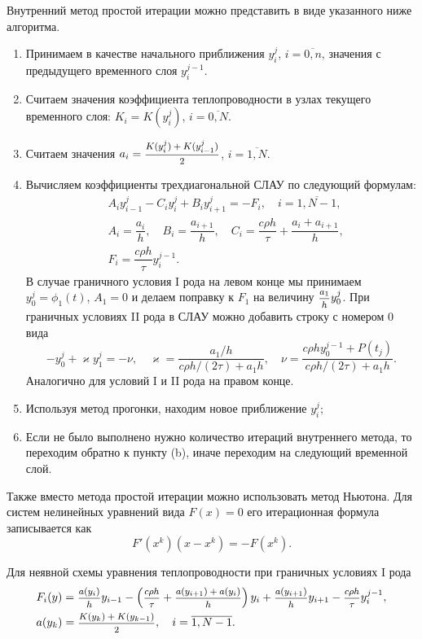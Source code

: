 \documentclass[12pt, a4paper]{article}
\begin{document}
\begin{enumerate}
		Внутренний метод простой итерации можно представить в виде указанного ниже алгоритма.
		\begin{enumerate}
			\item Принимаем в качестве начального приближения $y_i^j$, $i = \overline{0, n}$, значения с предыдущего временного слоя $y_i^{j-1}$.
			\item Считаем значения коэффициента теплопроводности в узлах текущего временного слоя: $K_i = K(y_i^j)$, $i = \overline{0, N}$.
			\item Считаем значения $a_i = \hbox{\footnotesize$\displaystyle\frac{K(y_i^j) + K(y_{i-1}^j)}{2}$}$, $i = \overline{1, N}$.
			\item Вычисляем коэффициенты трехдиагональной СЛАУ по следующий формулам:
			\begin{eqnarray*}
				& A_i y_{i-1}^j - C_i y_i^j + B_i y_{i+1}^j = -F_i, \quad i = \overline{1, N-1}, \\
				& A_i = \dfrac{a_i}h, \quad B_i = \dfrac{a_{i+1}}h, \quad C_i = \dfrac{c\rho h}\tau + \dfrac{a_i + a_{i+1}}h, \\
				& F_i = \dfrac{c\rho h}\tau y_i^{j-1}.
			\end{eqnarray*}
			В случае граничного условия I рода на левом конце мы принимаем $y_0^j = \phi_1(t)$, $A_1 = 0$ и делаем поправку к $F_1$ на величину $\hbox{\footnotesize$\displaystyle\frac{a_1}{h}$} y_0^j$. При граничных условиях II рода в СЛАУ можно добавить строку с номером 0 вида
			\[
			- y_0^j + \varkappa y_1^j = - \nu, \quad \varkappa = \frac{a_1/h}{c\rho h/(2\tau) +a_1 h}, \quad \nu = \frac{c\rho h y_0^{j-1} + P(t_j)}{c\rho h/(2\tau) +a_1 h}.
			\]
			Аналогично для условий I и II рода на правом конце.
			\item Используя метод прогонки, находим новое приближение $y_i^j$;
			\item Если не было выполнено нужно количество итераций внутреннего метода, то переходим обратно к пункту (b), иначе переходим на следующий временной слой.
		\end{enumerate}
		
		Также вместо метода простой итерации можно использовать метод Ньютона. Для систем нелинейных уравнений вида $F(x) = 0$ его итерационная формула записывается как
		\[
		F'(x^k) (x-x^k) = -F(x^k).
		\]
		
		Для неявной схемы уравнения теплопроводности при граничных условиях I рода
		\begin{eqnarray*}
			& F_i(y) = \hbox{\footnotesize$\displaystyle\frac{a(y_i)}{h}$} y_{i-1} - \left(\hbox{\footnotesize$\displaystyle\frac{c \rho h}{\tau}$} + \hbox{\footnotesize$\displaystyle\frac{a(y_{i+1}) + a(y_i)}{h}$}\right) y_i + \hbox{\footnotesize$\displaystyle\frac{a(y_{i+1})}{h}$} y_{i+1} - \hbox{\footnotesize$\displaystyle\frac{c\rho h}{\tau}$} y_i^{j-1}, \\
			& a(y_k) = \hbox{\footnotesize$\displaystyle\frac{K(y_k) + K(y_{k-1})}{2}$}, \quad i = \overline{1, N-1}.
		\end{eqnarray*}
		

\end{enumerate}
\end{document}
